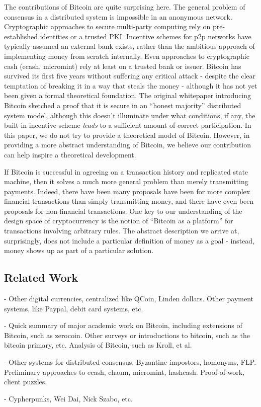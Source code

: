 The contributions of Bitcoin are quite surprising here. The general problem of consensus in a distributed system is impossible in an anonymous network. Cryptographic approaches to secure multi-party computing rely on pre-established identities or a trusted PKI. Incentive schemes for p2p networks have typically assumed an external bank exists, rather than the ambitious approach of implementing money from scratch internally. Even approaches to cryptographic cash (ecash, micromint) rely at least on a trusted bank or issuer. Bitcoin has survived its first five years without suffering any critical attack - despite the clear temptation of breaking it in a way that steals the money - although it has not yet been given a formal theoretical foundation. The original whitepaper introducing Bitcoin sketched a proof that it is secure in an ``honest majority'' distributed system model, although this doesn't illuminate under what conditions, if any, the built-in incentive scheme {\em leads} to a sufficient amount of correct participation. In this paper, we do not try to provide a theoretical model of Bitcoin. However, in providing a more abstract understanding of Bitcoin, we believe our contribution can help inspire a theoretical development. 

If Bitcoin is successful in agreeing on a transaction history and replicated state machine, then it solves a much more general problem than merely transmitting payments. Indeed, there have been many proposals have been for more complex financial transactions than simply transmitting money, and there have even been proposals for non-financial transactions. One key to our understanding of the design space of cryptocurrency is the notion of ``Bitcoin as a platform'' for transactions involving arbitrary rules. The abstract description we arrive at, surprisingly, does not include a particular definition of money as a goal - instead, money shows up as part of a particular solution.

\subsection{Related Work}

- Other digital currencies, centralized like QCoin, Linden dollars. Other payment systems, like Paypal, debit card systems, etc.

- Quick summary of major academic work on Bitcoin, including extensions of Bitcoin, such as zerocoin. Other surveys or introductions to bitcoin, such as the bitcoin primary, etc. Analysis of Bitcoin, such as Kroll, et al.

- Other systems for distributed consensus, Byzantine impostors, homonyms, FLP. Preliminary approaches to ecash, chaum, micromint, hashcash.
Proof-of-work, client puzzles.

- Cypherpunks, Wei Dai, Nick Szabo, etc.
